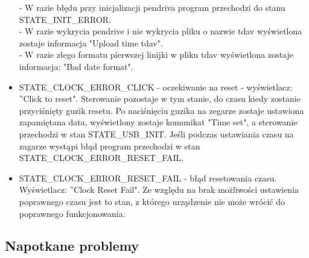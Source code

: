 \documentclass[declaration,shortabstract, mgr]{iithesis}
\begin{document}
\begin{itemize}
- W razie błędu przy inicjalizacji pendriva program przechodzi do stanu STATE\_INIT\_ERROR. \\
- W razie wykrycia pendrive i nie wykrycia pliku o nazwie tdav wyświetlona zostaje informacja "Upload time tdav".\\
- W razie złego formatu pierwszej linijki w pliku tdav wyświetlona zostaje informacja: "Bad date format".
\item STATE\_CLOCK\_ERROR\_CLICK - oczekiwanie na reset - wyświetlacz: ''Click to reset". Sterowanie pozostaje w tym stanie, do czasu kiedy zostanie przyciśnięty guzik resetu. Po naciśnięciu guzika na zegarze zostaje ustawiona zapamiętana data, wyświetlony zostaje komunikat "Time set", a sterowanie przechodzi w stan STATE\_USB\_INIT. Jeśli podczas ustawiania czasu na zagarze wystąpi błąd program przechodzi w stan STATE\_CLOCK\_ERROR\_RESET\_FAIL.
\item STATE\_CLOCK\_ERROR\_RESET\_FAIL - błąd resetowania czasu. Wyświetlacz: ''Clock Reset Fail". Ze względu na brak możliwości ustawienia poprawnego czasu jest to stan, z którego urządzenie nie może wrócić do poprawnego funkcjonowania.
\end{itemize}
\subsection{Napotkane problemy}
\end{document}
